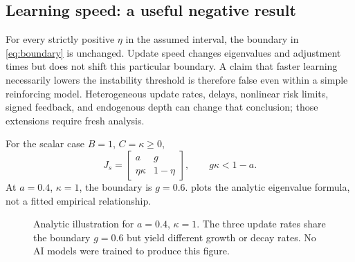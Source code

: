 \documentclass[11pt,a4paper]{article}
\theoremstyle{definition}
\theoremstyle{remark}
\begin{document}
\subsection{Learning speed: a useful negative result}
For every strictly positive $\eta$ in the assumed interval, the boundary in \cref{eq:boundary} is unchanged. Update speed changes eigenvalues and adjustment times but does not shift this particular boundary. A claim that faster learning necessarily lowers the instability threshold is therefore false even within a simple reinforcing model. Heterogeneous update rates, delays, nonlinear risk limits, signed feedback, and endogenous depth can change that conclusion; those extensions require fresh analysis.

For the scalar case $B=1$, $C=\kappa\geq0$,
\begin{equation}
 J_s=\begin{bmatrix}a&g\\\eta\kappa&1-\eta\end{bmatrix},
 \qquad g\kappa<1-a.
 \label{eq:scalar}
\end{equation}
At $a=0.4$, $\kappa=1$, the boundary is $g=0.6$.  plots the analytic eigenvalue formula, not a fitted empirical relationship.

\begin{figure}[htbp]
\centering
{}
\caption{Analytic illustration for $a=0.4$, $\kappa=1$. The three update rates share the boundary $g=0.6$ but yield different growth or decay rates. No AI models were trained to produce this figure.}
\label{fig:boundary}
\end{figure}
\end{document}
